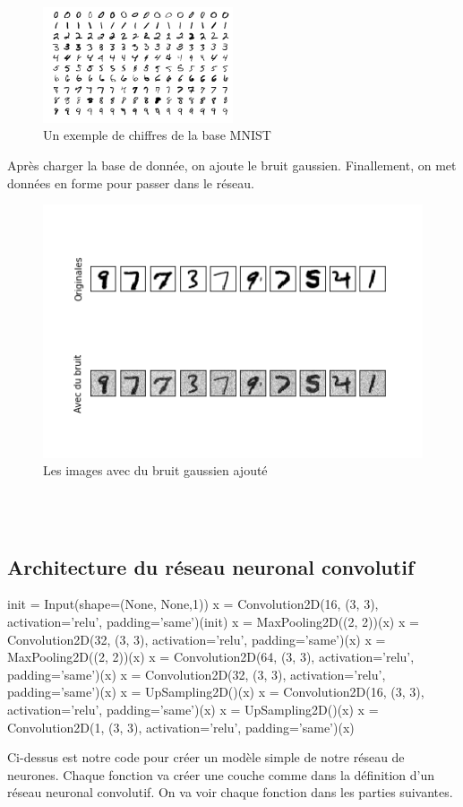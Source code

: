 \documentclass[12pt,a4paper]{article}
\begin{document}
\begin{figure}[h!]
  \centering
  \includegraphics[width=0.5\textwidth]{mnist.png}
  \caption{Un exemple de chiffres de la base MNIST}
  \label{fig:2}
\end{figure} 
Après charger la base de donnée, on ajoute le bruit gaussien. Finallement, on met données en forme pour passer dans le réseau.
\begin{figure}[h!]
  \centering
  \includegraphics[width=1\textwidth]{without_result.png}
  \caption{Les images avec du bruit gaussien ajouté}
  \label{fig:3}
\end{figure}
\\
\\
\subsection{Architecture du réseau neuronal convolutif}
\begin{python}
init = Input(shape=(None, None,1))
x = Convolution2D(16, (3, 3), activation='relu', padding='same')(init) 
x = MaxPooling2D((2, 2))(x)
x = Convolution2D(32, (3, 3), activation='relu', padding='same')(x) 
x = MaxPooling2D((2, 2))(x)
x = Convolution2D(64, (3, 3), activation='relu', padding='same')(x)
x = Convolution2D(32, (3, 3), activation='relu', padding='same')(x)
x = UpSampling2D()(x)
x = Convolution2D(16, (3, 3), activation='relu', padding='same')(x)
x = UpSampling2D()(x)
x = Convolution2D(1, (3, 3), activation='relu', padding='same')(x)
\end{python}
Ci-dessus est notre code pour créer un modèle simple de notre réseau de neurones.
Chaque fonction va créer une couche comme dans la définition d'un réseau neuronal convolutif.
On va voir chaque fonction dans les parties suivantes.
\end{document}

